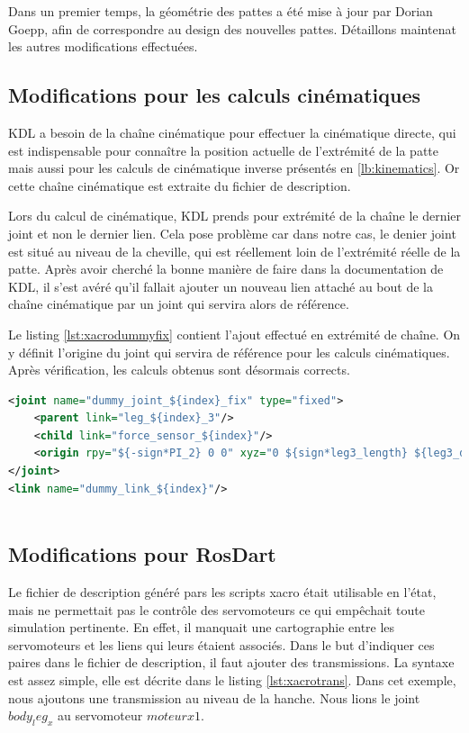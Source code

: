 \documentclass{tnreport}
\begin{document}
Dans un premier temps, la géométrie des pattes a été mise à jour par Dorian Goepp, afin de correspondre au design des nouvelles pattes. Détaillons maintenat les autres modifications effectuées. 
\subsection{Modifications pour les calculs cinématiques}\label{lb:majurdfkinetic}

KDL a besoin de la chaîne cinématique pour effectuer la cinématique directe, qui est indispensable pour connaître la position actuelle de l'extrémité de la patte mais aussi pour les calculs de cinématique inverse présentés en \ref{lb:kinematics}. Or cette chaîne cinématique est extraite du fichier de description. 

Lors du calcul de cinématique, KDL prends pour extrémité de la chaîne le dernier joint et non le dernier lien. Cela pose problème car dans notre cas, le denier joint est situé au niveau de la cheville, qui est réellement loin de l'extrémité réelle de la patte. Après avoir cherché la bonne manière de faire dans la documentation de KDL, il s'est avéré qu'il fallait ajouter un nouveau lien attaché au bout de la chaîne cinématique par un joint qui servira alors de référence. 

Le listing \ref{lst:xacrodummyfix} contient l'ajout effectué en extrémité de chaîne. On y définit l'origine du joint qui servira de référence pour les calculs cinématiques. Après vérification, les calculs obtenus sont désormais corrects. 
\clearpage
\begin{lstlisting}[language=XML,caption={Correction de l'extrémité de la patte},label={lst:xacrodummyfix}]
<joint name="dummy_joint_${index}_fix" type="fixed">
    <parent link="leg_${index}_3"/>
    <child link="force_sensor_${index}"/>
    <origin rpy="${-sign*PI_2} 0 0" xyz="0 ${sign*leg3_length} ${leg3_dist}"/>
</joint>
<link name="dummy_link_${index}"/>
        
\end{lstlisting}


\subsection{Modifications pour RosDart}
Le fichier de description généré pars les scripts xacro était utilisable en l'état, mais ne permettait pas le contrôle des servomoteurs ce qui empêchait toute simulation pertinente. En effet, il manquait une cartographie entre les servomoteurs et les liens qui leurs étaient associés. Dans le but d'indiquer ces paires dans le fichier de description, il faut ajouter des transmissions. La syntaxe est assez simple, elle est décrite dans le listing \ref{lst:xacrotrans}. Dans cet exemple, nous ajoutons une transmission au niveau de la hanche. Nous lions le joint $body_leg_x$ au servomoteur $moteurx1$. 
\end{document}
